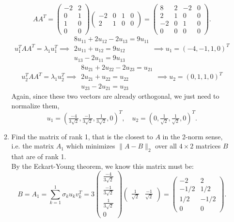 \documentclass[11pt]{article}
\newcommand{\n}{\vspace{0.3cm}}
\begin{document}
\begin{enumerate}
\begin{enumerate}
    \[
    AA^T =
    \left( \begin{array}{rr} -2 & 2 \\ 0 & 1 \\ 1 & 0 \\ 0 & 0 \end{array} \right)
    \left( \begin{array}{rrrr} -2 & 0 & 1 & 0 \\ 2 & 1 & 0 & 0 \end{array} \right)
    = \left(\begin{array}{rrrr}
        8 & 2 & -2 & 0 \\ 2 & 1 & 0 & 0 \\ -2 & 0 & 1 & 0 \\ 0 & 0 & 0 & 0
        \end{array}\right).
    \]
    \[
    u_1^T AA^T = \lambda_1 u_1^T \implies
    \begin{array}{r}
        8u_{11} + 2u_{12} - 2u_{13} = 9u_{11} \\
        2u_{11} + u_{12} = 9u_{12}            \\
        u_{13} - 2u_{11} = 9u_{13}
    \end{array}
    \implies u_1 = (-4, -1, 1, 0)^T
    \]
    \[
    u_2^T AA^T = \lambda_1 u_2^T \implies
    \begin{array}{r}
        8u_{21} + 2u_{22} - 2u_{23} = u_{21} \\
        2u_{21} + u_{22} = u_{22}            \\
        u_{23} - 2u_{21} = u_{23}
    \end{array}
    \implies u_2 = (0, 1, 1, 0)^T
    \]
    Again, since these two vectors are already orthogonal, we just need to normalize them,
    \[
    u_1 = \left(\tfrac{-4}{3\sqrt2}, \tfrac{-1}{3\sqrt2}, \tfrac{1}{3\sqrt2}, 0\right)^T, \quad
    u_2 = \left(0, \tfrac{1}{\sqrt2}, \tfrac{1}{\sqrt2}, 0\right)^T.
    \]
    
	\item Find the matrix of rank 1, that is the closest to \(A\) in the 2-norm sense, i.e. the matrix \(A_1\) which minimizes \(\lVert A - B \rVert_2\) over all \(4 \times 2\) matrices \(B\) that are of rank 1. \n\\
    By the Eckart-Young theorem, we know this matrix must be:
    \[B = A_1 = \sum_{k=1}^1 \sigma_k u_k v_k^T = 3
    \left(\begin{array}{r} \tfrac{-4}{3\sqrt2} \\ \tfrac{-1}{3\sqrt2} \\ \tfrac{1}{3\sqrt2} \\ 0 \end{array}\right)
    \left(\begin{array}{rr} \tfrac{1}{\sqrt2} & \tfrac{-1}{\sqrt2} \end{array}\right) =
    \left(\begin{array}{rr} -2 & 2 \\ -1/2 & 1/2 \\ 1/2 & -1/2 \\ 0 & 0 \end{array}\right).
    \]
\end{enumerate}


\end{enumerate}
\end{document}
